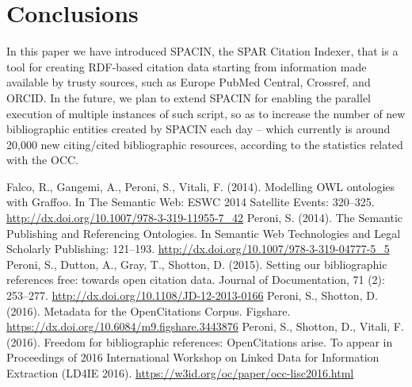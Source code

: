 \documentclass[runningheads,a4paper]{llncs}
\begin{document}
\section{Conclusions}

In this paper we have introduced SPACIN, the SPAR Citation Indexer, that is a tool for creating RDF-based citation data starting from information made available by trusty sources, such as Europe PubMed Central, Crossref, and ORCID. In the future, we plan to extend SPACIN for enabling the parallel execution of multiple instances of such script, so as to increase the number of new bibliographic entities created by SPACIN each day -- which currently is around 20,000 new citing/cited bibliographic resources, according to the statistics related with the OCC.

\begin{thebibliography}{4}

 Falco, R., Gangemi, A., Peroni, S., Vitali, F. (2014). Modelling OWL ontologies with Graffoo. In The Semantic Web: ESWC 2014 Satellite Events: 320--325. \url{http://dx.doi.org/10.1007/978-3-319-11955-7\_42}
 Peroni, S. (2014). The Semantic Publishing and Referencing Ontologies. In Semantic Web Technologies and Legal Scholarly Publishing: 121--193. \url{http://dx.doi.org/10.1007/978-3-319-04777-5\_5}
 Peroni, S., Dutton, A., Gray, T., Shotton, D. (2015). Setting our bibliographic references free: towards open citation data. Journal of Documentation, 71 (2): 253--277. \url{http://dx.doi.org/10.1108/JD-12-2013-0166}
 Peroni, S., Shotton, D. (2016). Metadata for the OpenCitations Corpus. Figshare. \url{https://dx.doi.org/10.6084/m9.figshare.3443876}
 Peroni, S., Shotton, D., Vitali, F. (2016). Freedom for bibliographic references: OpenCitations arise. To appear in Proceedings of 2016 International Workshop on Linked Data for Information Extraction (LD4IE 2016). \url{https://w3id.org/oc/paper/occ-lisc2016.html}

\end{thebibliography}
\end{document}

